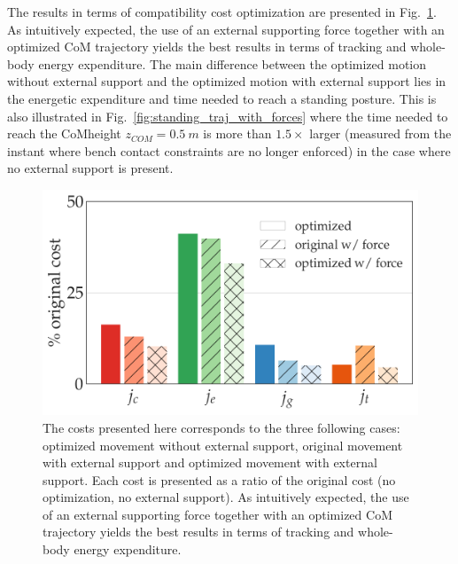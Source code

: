 \documentclass[12pt,a4paper,twoside]{article}
\begin{document}
The results in terms of compatibility cost optimization are presented in Fig.~\ref{fig:standing_w_forces_costs}. As intuitively expected, the use of an external supporting force together with an optimized CoM trajectory yields the best results in terms of tracking and whole-body energy expenditure. The main difference between the optimized motion without external support and the optimized motion with external support lies in the energetic expenditure and time needed to reach a standing posture. This is also illustrated in Fig.~\ref{fig:standing_traj_with_forces} where the time needed to reach the CoMheight $z_{COM} = 0.5~m$ is more than $1.5\times$ larger (measured from the instant where bench contact constraints are no longer enforced) in the case where no external support is present.

\begin{figure}[!h]
	\begin{minipage}[c]{0.6\textwidth}
	\centering
    \includegraphics[width=\textwidth, trim={0cm 0.5cm 0cm 0cm}, clip]{with_forces/standing_costs}
  	\end{minipage}\hfill
  \begin{minipage}[c]{0.37\textwidth}
      \setlength{\belowcaptionskip}{-12pt}
    \caption{The costs presented here corresponds to the three following cases: optimized movement without external support, original movement with external support and optimized movement with external support. Each cost is presented as a ratio of the original cost (no optimization, no external support). As intuitively expected, the use of an external supporting force together with an optimized CoM trajectory yields the best results in terms of tracking and whole-body energy expenditure.}
    \label{fig:standing_w_forces_costs}
  \end{minipage}
\end{figure}
\end{document}
